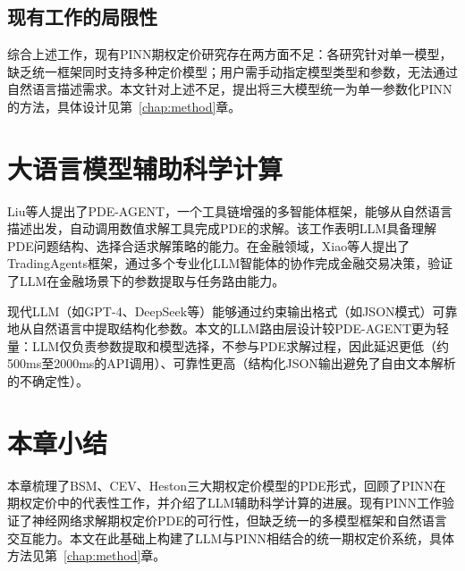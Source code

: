 \subsection{现有工作的局限性}

综合上述工作，现有PINN期权定价研究存在两方面不足：各研究针对单一模型，缺乏统一框架同时支持多种定价模型；用户需手动指定模型类型和参数，无法通过自然语言描述需求。本文针对上述不足，提出将三大模型统一为单一参数化PINN的方法，具体设计见第~\ref{chap:method}章。

\section{大语言模型辅助科学计算}\label{sec:llm_sci}

Liu等人\cite{liu2025pdeagent}提出了PDE-AGENT，一个工具链增强的多智能体框架，能够从自然语言描述出发，自动调用数值求解工具完成PDE的求解。该工作表明LLM具备理解PDE问题结构、选择合适求解策略的能力。在金融领域，Xiao等人\cite{xiao2024tradingagents}提出了TradingAgents框架，通过多个专业化LLM智能体的协作完成金融交易决策，验证了LLM在金融场景下的参数提取与任务路由能力。

现代LLM（如GPT-4、DeepSeek等）能够通过约束输出格式（如JSON模式）可靠地从自然语言中提取结构化参数。本文的LLM路由层设计较PDE-AGENT更为轻量：LLM仅负责参数提取和模型选择，不参与PDE求解过程，因此延迟更低（约500ms至2000ms的API调用）、可靠性更高（结构化JSON输出避免了自由文本解析的不确定性）。

\section{本章小结}\label{sec:related_summary}

本章梳理了BSM、CEV、Heston三大期权定价模型的PDE形式，回顾了PINN在期权定价中的代表性工作，并介绍了LLM辅助科学计算的进展。现有PINN工作验证了神经网络求解期权定价PDE的可行性，但缺乏统一的多模型框架和自然语言交互能力。本文在此基础上构建了LLM与PINN相结合的统一期权定价系统，具体方法见第~\ref{chap:method}章。
